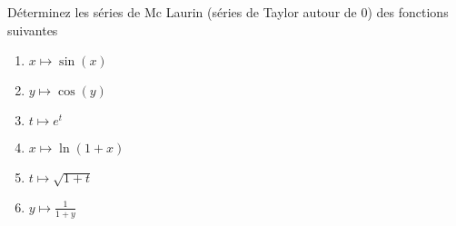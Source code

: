 
\begin{exercice}\label{exoDevel0005}

Déterminez les séries de Mc Laurin (séries de Taylor autour de 0) des fonctions suivantes
\begin{multicols}{2}
\begin{enumerate}
\item $ x \mapsto \sin(x) $
\item $ y \mapsto \cos(y) $
\item $ t \mapsto e^t $
\item $ x \mapsto \ln(1+x) $
\item $ t \mapsto  \sqrt{1 + t} $
\item $ y \mapsto \frac{1}{1 +y} $
\end{enumerate}
\end{multicols}

\end{exercice}
